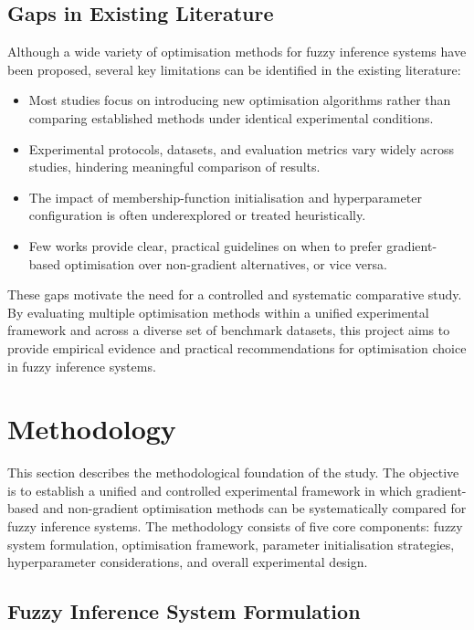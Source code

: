 \documentclass[a4paper,12pt,oneside]{article}
\begin{document}
\subsection{Gaps in Existing Literature}

Although a wide variety of optimisation methods for fuzzy inference systems have been proposed, several key limitations can be identified in the existing literature:
\begin{itemize}
    \item Most studies focus on introducing new optimisation algorithms rather than comparing established methods under identical experimental conditions.
    \item Experimental protocols, datasets, and evaluation metrics vary widely across studies, hindering meaningful comparison of results.
    \item The impact of membership-function initialisation and hyperparameter configuration is often underexplored or treated heuristically.
    \item Few works provide clear, practical guidelines on when to prefer gradient-based optimisation over non-gradient alternatives, or vice versa.
\end{itemize}

These gaps motivate the need for a controlled and systematic comparative study. By evaluating multiple optimisation methods within a unified experimental framework and across a diverse set of benchmark datasets, this project aims to provide empirical evidence and practical recommendations for optimisation choice in fuzzy inference systems.

\newpage
\section{Methodology}

This section describes the methodological foundation of the study. The objective is to establish a unified and controlled experimental framework in which gradient-based and non-gradient optimisation methods can be systematically compared for fuzzy inference systems. The methodology consists of five core components: fuzzy system formulation, optimisation framework, parameter initialisation strategies, hyperparameter considerations, and overall experimental design.

\subsection{Fuzzy Inference System Formulation}
\end{document}
